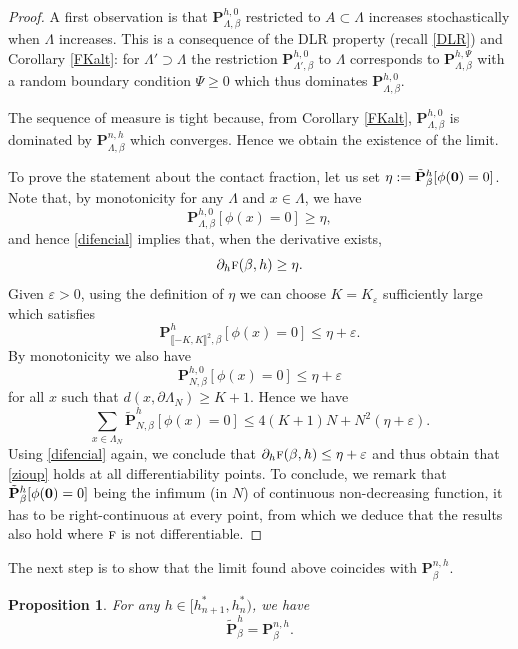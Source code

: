 \documentclass[JEP,XML,SOM,Unicode, NoFloatCountersInSection]{cedram}
\numberwithin{equation}{section}
\theoremstyle{plain}
\newtheorem{proposition}[theorem]{Proposition}
\theoremstyle{definition}
\newcommand{\lint}{\llbracket}
\newcommand{\rint}{\rrbracket}
\newcommand{\bP}{{\ensuremath{\mathbf P}} }
\newcommand{\gb}{\beta}
\newcommand{\gep}{\varepsilon}
\newcommand{\gL}{\Lambda}
\newcommand{\tf}{\textsc{f}}
\begin{document}
\begin{proof}
A first observation is that $\bP^{h,0}_{\gL,\gb}$ restricted to $A\subset \gL$ increases stochastically when $\gL$ increases.
This is a consequence of the DLR property (recall \eqref{DLR}) and Corollary \ref{FKalt}: for $\gL'\supset \gL$ the restriction
$\bP^{h,0}_{\gL',\gb}$ to $\gL$ corresponds to $\bP^{h,\Psi}_{\gL,\gb}$ with a random boundary condition $\Psi\ge 0$ which thus dominates $\bP^{h,0}_{\gL,\gb}$.

The sequence of measure is tight because, from Corollary \ref{FKalt}, $\bP^{h,0}_{\gL,\gb}$ is dominated by $\bP^{n,h}_{\gL,\gb}$ which converges.
Hence we obtain the existence of the limit.

To prove the statement about the contact fraction, let us set $\eta:= \tilde \bP^{h}_{\gb}[\phi({\bf 0})=0]$.
Note that, by monotonicity for any $\gL$ and $x\in \gL$, we have
\begin{equation*}
\bP^{h,0}_{\gL,\gb}[\phi(x)=0] \ge \eta,
\end{equation*}
and hence \eqref{difencial} implies that, when the derivative exists,
\begin{equation*}
\partial_h\tf(\gb,h)\ge \eta.
\end{equation*}
Given $\gep>0$, using the definition of $\eta$ we can choose $K=K_\gep$ sufficiently large which satisfies
\[
\bP^{h}_{\lint -K,K\rint^2,\gb}[\phi(x)=0]\le \eta+\gep.
\]
By monotonicity we also have
\[
\bP^{h,0}_{N,\gb}[\phi(x)=0]\le \eta+\gep
\]
for all $x$ such that $d(x,\partial \gL_N)\ge K+1$.
Hence we have
\begin{equation*}
\sum_{x\in \gL_N} \tilde \bP^{h}_{N,\gb}[\phi(x)=0]\le 4 (K+1) N+ N^2(\eta+\gep).
\end{equation*}
Using \eqref{difencial} again, we conclude that $\partial_h\tf(\gb,h)\le \eta+\gep$ and thus obtain that \eqref{zioup} holds at all differentiability points.
To conclude, we remark that $\tilde \bP^{h}_{\gb}[\phi({\bf 0})=0]$ being the infimum (in $N$) of continuous non-decreasing function, it has to be right-continuous 
at every point, from which we deduce that the results also hold where $\tf$ is not differentiable.
\end{proof}

The next step is to show that the limit found above coincides with $\bP^{n,h}_{\gb}$.

\begin{proposition}\label{dabot}
For any $h\in [h^*_{n+1},h^*_n)$, we have
\begin{equation}
\tilde \bP^{h}_{\gb}= \bP^{n,h}_{\gb}.
\end{equation}
\end{proposition}
\end{document}
